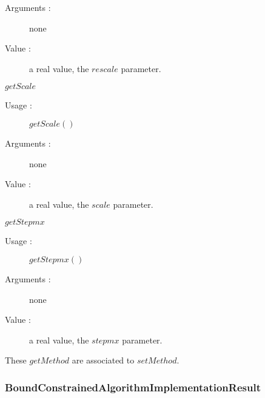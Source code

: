 \begin{description}
\begin{description}
\begin{description}
    \item[Arguments :] none
    \item[Value :]  a real value, the $rescale$ parameter.
    \end{description}
    \bigskip
  \item $getScale$
    \begin{description}
    \item[Usage :] $getScale()$
    \item[Arguments :] none
    \item[Value :]  a real value, the $scale$ parameter.
    \end{description}
    \bigskip
  \item $getStepmx$
    \begin{description}
    \item[Usage :] $getStepmx()$
    \item[Arguments :] none
    \item[Value :]  a real value, the $stepmx$ parameter.
    \end{description}
  \end{description}

  These  $getMethod$  are associated to  $setMethod$.
\end{description}



\newpage                 \subsubsection{BoundConstrainedAlgorithmImplementationResult}



